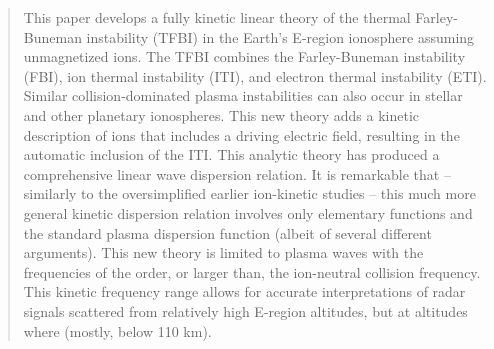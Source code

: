 \documentclass[draft]{agujournal2019}
\begin{document}
\begin{abstract}
This paper develops a fully kinetic linear theory of the thermal Farley-Buneman instability (TFBI) in the Earth's E-region ionosphere assuming unmagnetized ions. The TFBI combines the Farley-Buneman instability (FBI), ion thermal instability (ITI), and electron thermal instability (ETI). Similar collision-dominated plasma instabilities can also occur in stellar and other planetary ionospheres. This new theory adds a kinetic description of ions that includes a driving electric field, resulting in the automatic inclusion of the ITI. This analytic theory has produced a comprehensive linear wave dispersion relation. It is remarkable that -- similarly to the oversimplified earlier ion-kinetic studies -- this much more general kinetic dispersion relation involves only elementary functions and the standard plasma dispersion function (albeit of several different arguments). This new theory is limited to plasma waves with the frequencies of the order, or larger than, the ion-neutral collision frequency. This kinetic frequency range allows for accurate interpretations of radar signals scattered from relatively high E-region altitudes, but at altitudes where  (mostly, below 110 km).
\end{abstract}

%
%

%


%
%
%
%
\end{document}
